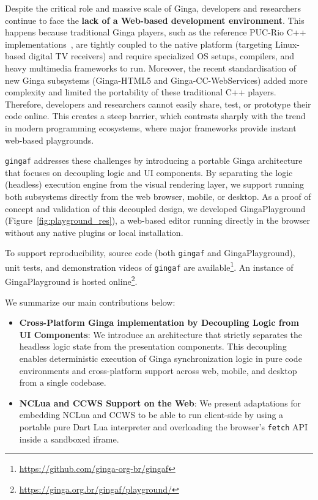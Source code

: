 \documentclass[sigconf]{webmedia}
\newcommand{\projectname}{\texttt{gingaf}}
\begin{document}
Despite the critical role and massive scale of Ginga, developers and researchers continue to face the \textbf{lack of a Web-based development environment}. This happens because traditional Ginga players, such as the reference PUC-Rio C++ implementations~\cite{ginga2013, ginga2018}, are tightly coupled to the native platform (targeting Linux-based digital TV receivers) and require specialized OS setups, compilers, and heavy multimedia frameworks to run. Moreover, the recent standardisation of new Ginga subsystems (Ginga-HTML5 and Ginga-CC-WebServices) added more complexity and limited the portability of these traditional C++ players. Therefore, developers and researchers cannot easily share, test, or prototype their code online. This creates a steep barrier, which contrasts sharply with the trend in modern programming ecosystems, where major frameworks provide instant web-based playgrounds. 

\projectname{} addresses these challenges by introducing a portable Ginga architecture that focuses on decoupling logic and UI components.  By separating the logic (headless) execution engine from the visual rendering layer, we support running both subsystems directly from the web browser, mobile, or desktop. As a proof of concept and validation of this decoupled design, we developed GingaPlayground (Figure~\ref{fig:playground_res}), a web-based editor running directly in the browser without any native plugins or local installation.

To support reproducibility, source code (both \projectname{} and GingaPlayground), unit tests, and demonstration videos of \projectname{} are available\footnote{\url{https://github.com/ginga-org-br/gingaf}}. An instance of GingaPlayground is hosted online\footnote{\url{https://ginga.org.br/gingaf/playground/}}.

We summarize our main contributions below:

\begin{itemize}
  \item \textbf{Cross-Platform Ginga implementation by Decoupling Logic from UI Components}: We introduce an architecture that strictly separates the headless logic state from the presentation components. This decoupling enables deterministic execution of Ginga synchronization logic in pure code environments and cross-platform support across web, mobile, and desktop from a single codebase.
  \item \textbf{NCLua and CCWS Support on the Web}: We present adaptations for embedding NCLua and CCWS to be able to run client-side by using a portable pure Dart Lua interpreter and overloading the browser's \texttt{fetch} API inside a sandboxed iframe.
\end{itemize}
\end{document}
